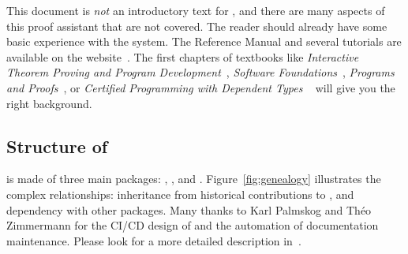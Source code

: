 \documentclass[twoside,a4paper]{book}
\begin{document}
This document is \emph{not} an introductory text for \coq, and there are many aspects of this proof assistant that are not covered. 
The reader should already have some basic experience with the \coq system. The Reference Manual and several tutorials are available on the \coq website~\cite{Coq}. The first chapters of textbooks like \emph{Interactive Theorem Proving and Program Development}~\cite{BC04},
\emph{Software Foundations}~\cite{SF},
\emph{Programs and Proofs}~\cite{Sergey:PnP},
or  \emph{Certified Programming with Dependent Types} ~\cite{chlipalacpdt2011} will give you the right background.

 
 
 \subsection{Structure of \Hydras}

 \Hydras is made of three main packages: \HydrasLib, \gaiaHydras, and \additions. Figure~\ref{fig:genealogy}  illustrates
 the complex relationships: inheritance from historical contributions to \coq, and dependency with other \coq packages.
 Many thanks to  Karl Palmskog and Théo Zimmermann for the CI/CD design of \Hydras and the automation of documentation maintenance.
 Please look for a more detailed description in~\cite{jfla2022}.
 
\end{document}
